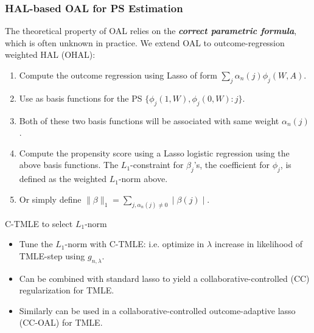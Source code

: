 \documentclass[t]{beamer}
\begin{document}
\begin{frame}
\frametitle{HAL-based OAL for PS Estimation}
The theoretical property of OAL relies on the \textbf{\textit{correct parametric formula}}, which is often unknown in practice.
We extend OAL to outcome-regression weighted HAL (OHAL):
\begin{enumerate}
\item Compute the outcome regression using Lasso of form $\sum_j \alpha_n(j)\phi_j(W,A)$.
\item Use as basis functions for the PS $\{\phi_j(1,W),\phi_j(0,W): j\}$.
\item Both of these two basis functions will be associated with same weight $\alpha_n(j)$.
\item Compute the propensity score using a Lasso logistic regression using the above basis functions.  The $L_1$-constraint for $\beta_{j}$'s, the coefficient for $\phi_j$, is defined as the weighted $L_1$-norm above.
\item Or simply define $\lVert \beta \rVert_1=\sum_{j, \alpha_n(j)\not =0}\mid \beta(j)\mid$.
\end{enumerate}
\end{frame}
\begin{frame}{C-TMLE to select $L_1$-norm}
\begin{itemize}
  \item Tune the $L_1$-norm with C-TMLE: i.e. optimize in $\lambda$ increase in likelihood of TMLE-step using $g_{n,\lambda}$.
  \item Can be combined with standard lasso to yield a collaborative-controlled (CC) regularization for TMLE.
  \item Similarly can be used in a collaborative-controlled outcome-adaptive lasso (CC-OAL) for TMLE.
\end{itemize}
\end{frame}
\end{document}
